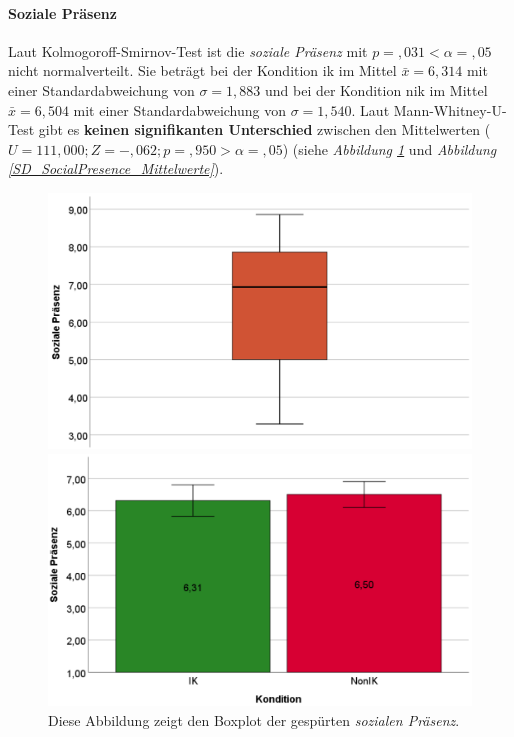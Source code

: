 \documentclass[a4paper,11pt]{article}%
\renewcommand{\\}{\vspace*{0.5\baselineskip} \newline}
\begin{document}
{\paragraph{Soziale Präsenz} 
Laut Kolmogoroff-Smirnov-Test ist die \textit{soziale Präsenz} mit $p =,031 < \alpha = ,05$ nicht normalverteilt. 
Sie beträgt bei der Kondition \ac{ik} im Mittel $\bar{x} = 6,314$ mit einer Standardabweichung von $\sigma = 1,883$ und
bei der Kondition \ac{nik} im Mittel $\bar{x} = 6,504$ mit einer Standardabweichung von $\sigma = 1,540$. 
Laut Mann-Whitney-U-Test gibt es \textbf{keinen signifikanten Unterschied} zwischen den Mittelwerten ($U = 111,000; Z = -,062; p =,950 > \alpha = ,05$) (siehe \textit{Abbildung \ref{BP_SocialPresence}} und \textit{Abbildung \ref{SD_SocialPresence_Mittelwerte}}).
	
		\begin{figure}[H]
   \begin{minipage}[t]{.5\linewidth} %
      \includegraphics[width=\linewidth]{Abbildungen/AuswertungDiagramme/Final/BP_SocialPresence.png}
      \caption[Boxplot der gespürten sozialen Präsenz]{Diese Abbildung zeigt den Boxplot der gespürten \textit{sozialen Präsenz}.}
            \label{BP_SocialPresence}
   \end{minipage}
   \hspace{.02\linewidth}%
   \begin{minipage}[t]{.5\linewidth} %
     \includegraphics[width=\linewidth]{Abbildungen/AuswertungDiagramme/Final/SD_SocialPresence_Mittelwerte.png}

\end{minipage}
\end{figure}}
\end{document}

